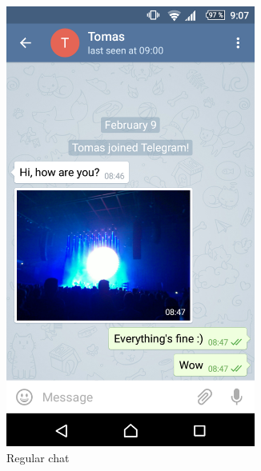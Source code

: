 \documentclass[thesis=M,english]{FITthesis}[2012/10/20]
\begin{document}
\begin{figure}[htb]
	\centering
	\label{A}
	\begin{subfigure}[b]{0.4\textwidth}
		\centering
		\includegraphics[width=0.9\textwidth]{telegram-regular.png}
		\caption{Regular chat}
		\label{img:telegram:regular}
	\end{subfigure}
	\hfill
	\begin{subfigure}[b]{0.4\textwidth}
		\centering

\end{subfigure}
\end{figure}
\end{document}
